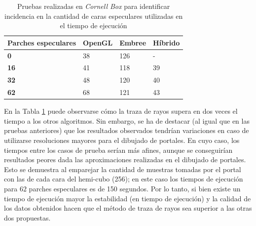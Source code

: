 \begin{table}[htbp]
	\centering
	\caption{Pruebas realizadas en \textit{Cornell Box} para identificar incidencia en la cantidad de caras especulares utilizadas en el tiempo de ejecución}
\begin{tabular}{|l|l|l|l|}
	\hline
	\multicolumn{1}{|c|}{\textbf{Parches especulares}} & \multicolumn{1}{c|}{OpenGL} & \multicolumn{1}{c|}{Embree} & \multicolumn{1}{c|}{Híbrido} \\ \hline
	\textbf{0}                              & 38                          & 126                         & -                            \\ \hline
	\textbf{16}                             & 41                          & 118                         & 39                           \\ \hline
	\textbf{32}                             & 48                          & 120                         & 40                           \\ \hline
	\textbf{62}                             & 68                          & 121                         & 43                           \\ \hline
\end{tabular}
	\label{tab:caso3}
\end{table}

En la Tabla \ref{tab:caso3} puede observarse cómo la traza de rayos supera en dos veces el tiempo a los otros algoritmos. Sin embargo, se ha de destacar (al igual que en las pruebas anteriores) que los resultados observados tendrían variaciones en caso de utilizarse resoluciones mayores para el dibujado de portales. En cuyo caso, los tiempos entre los casos de prueba serían más afines, aunque se conseguirían resultados peores dada las aproximaciones realizadas en el dibujado de portales. Esto se demuestra al emparejar la cantidad de muestras tomadas por el portal con las de cada cara del hemi-cubo (256); en este caso los tiempos de ejecución para $62$ parches especulares es de 150 segundos. Por lo tanto, si bien existe un tiempo de ejecución mayor la estabilidad (en tiempo de ejecución) y la calidad de los datos obtenidos hacen que el método de traza de rayos sea superior a las otras dos propuestas.

